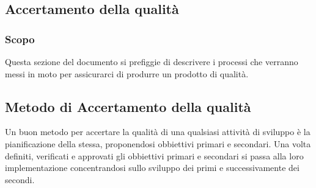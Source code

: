 \subsection{Accertamento della qualit\` a}
\subsubsection{Scopo}
Questa sezione del documento si prefiggie di descrivere i processi che verranno
messi in moto per assicurarci di produrre un prodotto di qualità.
\subsection{Metodo di Accertamento della qualità}
Un buon metodo per accertare la qualità di una qualsiasi attività di sviluppo è la
pianificazione della stessa, proponendosi obbiettivi primari e secondari.
Una volta definiti, verificati e approvati gli obbiettivi primari e secondari
si passa alla loro implementazione concentrandosi sullo sviluppo dei primi e
successivamente dei secondi.
